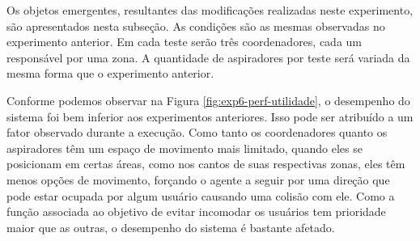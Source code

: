 Os objetos emergentes, resultantes das modificações realizadas neste experimento, são apresentados nesta subseção. As condições são as mesmas observadas no experimento anterior. Em cada teste serão três coordenadores, cada um responsável por uma zona. A quantidade de aspiradores por teste será variada da mesma forma que o experimento anterior. 

\begin{figure}[h!]
    \centering
\end{figure}

Conforme podemos observar na Figura \ref{fig:exp6-perf-utilidade}, o desempenho do sistema foi bem inferior aos experimentos anteriores. Isso pode ser atribuído a um fator observado durante a execução. Como tanto os coordenadores quanto os aspiradores têm um espaço de movimento mais limitado, quando eles se posicionam em certas áreas, como nos cantos de suas respectivas zonas, eles têm menos opções de movimento, forçando o agente a seguir por uma direção que pode estar ocupada por algum usuário causando uma colisão com ele. Como a função associada ao objetivo de evitar incomodar os usuários tem prioridade maior que as outras, o desempenho do sistema é bastante afetado. 

\begin{figure}[h!]
    \centering
\end{figure}


